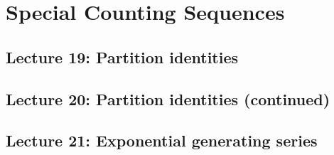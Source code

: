 \documentclass{report}
\begin{document}
{\chapter{Special Counting Sequences}

\section{Lecture 19: Partition identities}

\section{Lecture 20: Partition identities (continued)}

\section{Lecture 21: Exponential generating series}
}
\end{document}
